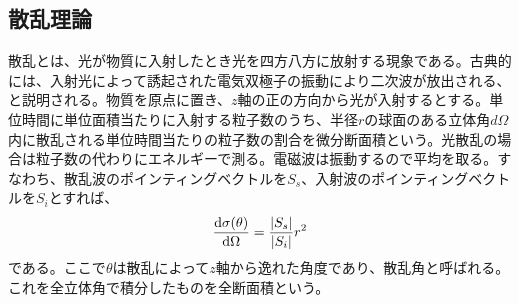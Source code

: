 \subsection{散乱理論}
    散乱とは、光が物質に入射したとき光を四方八方に放射する現象である。古典的には、入射光によって誘起された電気双極子の振動により二次波が放出される、と説明される。物質を原点に置き、$z$軸の正の方向から光が入射するとする。単位時間に単位面積当たりに入射する粒子数のうち、半径$r$の球面のある立体角$d\Omega$内に散乱される単位時間当たりの粒子数の割合を微分断面積という。光散乱の場合は粒子数の代わりにエネルギーで測る。電磁波は振動するので平均を取る。すなわち、散乱波のポインティングベクトルを$S_s$、入射波のポインティングベクトルを$S_i$とすれば、
        \[\dv{\sigma(\theta)}{\Omega} = \frac{|S_s|}{|S_i|}r^2\]
    である。ここで$\theta$は散乱によって$z$軸から逸れた角度であり、散乱角と呼ばれる。これを全立体角で積分したものを全断面積という。
    
